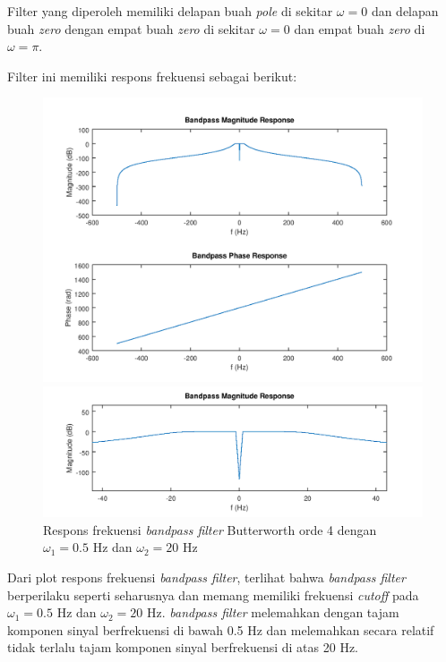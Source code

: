 \documentclass[11pt]{article}
\begin{document}
Filter yang diperoleh memiliki delapan buah \textit{pole} di sekitar $\omega = 0$ dan delapan buah \textit{zero} dengan empat buah \textit{zero} di sekitar $\omega = 0$ dan empat buah \textit{zero} di $\omega = \pi$.

Filter ini memiliki respons frekuensi sebagai berikut:

\begin{figure}[H]
\centerline{\includegraphics[scale=0.7]{figures/fig13-bpffreqresp.png}}
\centerline{\includegraphics[scale=0.335]{figures/fig14-bpfmagresp.png}}
\caption{Respons frekuensi \textit{bandpass filter} Butterworth orde 4 dengan $\omega_1 = 0.5$ Hz dan $\omega_2 = 20$ Hz}
\label{bpffreqresp}
\end{figure}

Dari plot respons frekuensi \textit{bandpass filter}, terlihat bahwa \textit{bandpass filter} berperilaku seperti seharusnya dan memang memiliki frekuensi \textit{cutoff} pada $\omega_1 = 0.5$ Hz dan $\omega_2 = 20$ Hz. \textit{bandpass filter} melemahkan dengan tajam komponen sinyal berfrekuensi di bawah 0.5 Hz dan melemahkan secara relatif tidak terlalu tajam komponen sinyal berfrekuensi di atas 20 Hz. 
\end{document}
